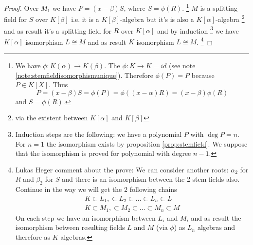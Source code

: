 \begin{theorem}
\begin{proof}
    Over $M_1$ we have $P = (x - \beta) S$, where
    $S = \phi\left(R\right)$.
    \footnote{
      We have $\phi: K\left(\alpha\right) \to
      K\left(\beta\right)$. The $\phi: K \to K = id$ (see note
      \ref{note:stemfieldisomorphismunique}).
      Therefore
      $\phi\left(P\right) = P$ because $P \in K\left[X\right]$.
      Thus
      \[
      P = (x - \beta) S = \phi\left(P\right) =
      \phi\left((x - \alpha) R\right) =
      (x - \beta) \phi\left(R\right)
      \]
      and $S = \phi\left(R\right)$.
    }
    $M$ is a splitting field for $S$ over $K\left[\beta\right]$
    i.e. it is a $K\left[\beta\right]$-algebra but it's is also
    a $K\left[\alpha\right]$-algebra
    \footnote{
      via
      the existent 
      between $K\left[\alpha\right]$ and $K\left[\beta\right]$
    }
    and as 
    result it's a splitting field for $R$ over $K\left[\alpha\right]$
    and by induction
    \footnote{
      Induction steps are the following: we have a polynomial $P$ with
      $\deg P = n$. For $n=1$ the isomorphism exists by proposition
      \ref{prop:stemfield}.
      We suppose that the isomorphism is proved for
      polynomial with degree $n-1$.
    }
    we have $K\left[\alpha\right]$ isomorphism $L \cong M$ and as
    result $K$ isomorphism $L \cong M$.
    \footnote{
      Lukas Heger comment about the prove:
      We can consider 
      another roots: $\alpha_2$ for $R$ and $\beta_2$ for $S$
      and there is an isomorphism between the 2 stem fields
      also. Continue in the way we will get the 2 following chains
      \begin{eqnarray}
        K \subset L_1, \subset L_2 \subset \dots \subset L_n \subset L
        \nonumber \\
        K \subset M_1, \subset M_2 \subset \dots \subset M_n \subset M
        \nonumber
      \end{eqnarray}
      On each step we have an isomorphism between $L_i$ and $M_i$ and as
      result the isomorphism between resulting fields $L$ and $M$ (via
      $\phi$) as $L_n$ algebras and therefore as $K$ algebras. 
    }
  \end{proof}
  \label{thm:lec2_1}
\end{theorem}

